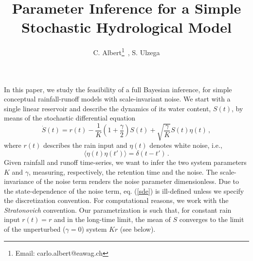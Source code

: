 \documentclass[11pt, a4paper]{article}
\begin{document}
\title{Parameter Inference for a Simple Stochastic Hydrological Model}

\author{C. Albert\thanks{\noindent Email: carlo.albert@eawag.ch} \,,
S. Ulzega}
\maketitle

In this paper, we study the feasibility of a full Bayesian inference, for simple conceptual rainfall-runoff models with scale-invariant noise.
We start with a single linear reservoir and describe the dynamics of its water content, $S(t)$, by means of the stochastic differential equation
\begin{equation}\label{sde}
\dot{S}(t) = r(t) - \frac{1}{K}\left(1+\frac{\gamma}{2}\right) S(t)
+
\sqrt{\frac{\gamma}{K}} S(t){\eta}(t)\,,
\end{equation}
where $r(t)$ describes the rain input and $\eta(t)$ denotes white noise, i.e.,
\begin{equation}\label{whitenoise}
\langle\eta(t)\eta(t')\rangle = \delta(t-t')\,.
\end{equation}
Given rainfall and runoff time-series, we want to infer the two system parameters $K$ and $\gamma$, measuring, respectively, the retention time and the noise.
The scale-invariance of the noise term renders the noise parameter dimensionless.
Due to the state-dependence of the noise term, eq. (\ref{sde}) is ill-defined unless we specify the discretization convention.
For computational reasons, we work with the {\em Stratonovich} convention.
Our parametrization is such that, for constant rain input $r(t)=r$ and in the long-time limit, the mean of $S$ converges to the limit of the unperturbed ($\gamma=0$) system $Kr$ (see below).
\end{document}

